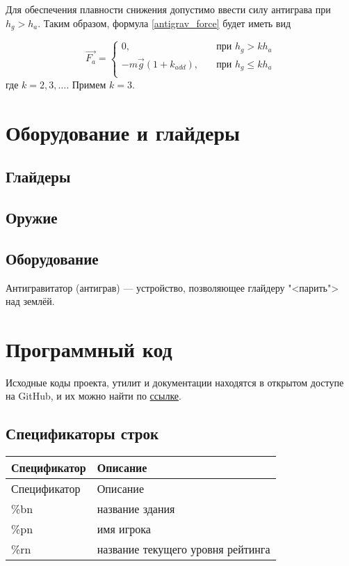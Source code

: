 \documentclass[a4paper,12pt]{report}
\begin{document}
Для обеспечения плавности снижения допустимо ввести силу антиграва при $h_{g} > h_a$. Таким образом, формула \eqref{antigrav_force} будет иметь вид

\begin{equation}
\vec{F_a} =
\begin{cases}
0, & \quad \text{при } h_{g} > k h_a \\
-m\vec{g}(1+ k_{add}), & \quad \text{при } h_{g} \le k h_a \\
\end{cases}
\end{equation}
где $k=2,3,\dots$. Примем $k=3$.

\chapter{Оборудование и глайдеры}
\section{Глайдеры}
\section{Оружие}
\section{Оборудование}

Антигравитатор (антиграв) --- устройство, позволяющее глайдеру "<парить"> над землёй.

\chapter{Программный код}

Исходные коды проекта, утилит и документации находятся в открытом доступе на GitHub, и их можно найти по \href{https://github.com/aimrebirth}{ссылке}.

\section{Спецификаторы строк}

\begin{longtable}{|l|l|}
\hline

Спецификатор & Описание\\ \hline
\endfirsthead

\hline
Спецификатор & Описание\\ \hline
\endhead

\%bn & название здания \\ \hline
\%pn & имя игрока \\ \hline
\%rn & название текущего уровня рейтинга \\ \hline

\end{longtable}
\end{document}
